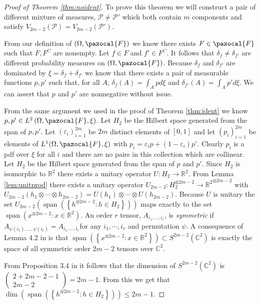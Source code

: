 \documentclass{article} %
\def\rn{\mathbb{R}}
\def\cn{\mathbb{C}}
\def\l{\left}
\def\r{\right}
\def\sF{\pazocal{F}}
\def\sP{\mathscr{P}}
\def\span{\operatorname{span}}
\theoremstyle{definition}
\begin{document}
\begin{proof}[Proof of Theorem \ref{thm:noident}]
To prove this theorem we will construct a pair of different mixture of measures, $\sP \neq \sP'$ which both contain $m$ components and satisfy $V_{2m-2}\left( \sP \right) = V_{2m-2}\left( \sP' \right)$.

From our definition of $\left( \Omega, \sF \right)$ we know there exists $F\in \sF$ such that $F, F^C$ are nonempty. Let $f\in F$ and $f' \in F^C$. It follows that $\delta_{f} \neq \delta_{f'}$ are different probability measures on $\left( \Omega, \sF \right)$. Because $\delta_{f}$ and $\delta_{f'}$ are dominated by $\xi = \delta_{f} + \delta_{f'}$ we know that there exists a pair of measurable functions $p, p'$ such that, for all $A$, $\delta_{f}\left( A \right) = \int_A p d\xi$ and $\delta_{f'}\left( A \right) = \int_{A} p'd\xi$. We can assert that $p$ and $p'$ are nonnegative without issue.

 From the same argument we used in the proof of Theorem \ref{thm:ident} we know $p,p' \in L^2\left( \Omega, \sF, \xi \right)$. Let $H_2$ be the Hilbert space generated from the span of $p,p'$. Let $(\varepsilon_i)_{i=1}^{2m}$ be $2m$ distinct elements of $\left[ 0,1 \right]$ and let $\left( p_i \right)_{i=1}^{2m}$ be elements of $L^1(\Omega, \sF, \xi)$ with $p_i = \varepsilon_i p + \left( 1-\varepsilon_i \right)p'$. Clearly $p_i$ is a pdf over $\xi$ for all $i$ and there are no pairs in this collection which are collinear. Let $H_2$ be the Hilbert space generated from the span of $p$ and $p'$. Since $H_2$ is isomorphic to $\rn^2$ there exists a unitary operator $U:H_2 \to \rn^2$. From Lemma \ref{lem:unitprod} there exists a unitary operator $U_{2m-2}:H_2^{\otimes 2m-2} \to {\rn^2}^{\otimes 2m-2}$ with $U_{2m-2}\left( h_1 \otimes\cdots \otimes h_{2m-2} \right) = U(h_1) \otimes \cdots \otimes U(h_{2m-2})$. Because $U$ is unitary the set $U_{2m-2}\left( \span\left( \left\{ h^{\otimes 2m-2}: h \in H_2 \right\} \right) \right)$ maps exactly to the set $\span\left( x^{\otimes 2m-2}:x \in \rn^2 \right)$.  An order $r$ tensor, $A_{i_1,\ldots,i_r}$, is {\it symmetric} if $A_{\psi\left( i_1 \right),\ldots,\psi\left( i_r \right)} = A_{i_1,\ldots,i_r}$for any $i_1,\cdots, i_r$ and permutation $\psi$. A consequence of Lemma 4.2 in \cite{symtensorrank} is that $\span\left( \l\{x^{\otimes 2m-2}:x \in \rn^2\r\} \right)\subset S^{2m-2}(\cn^2)$ is exactly the space of all symmetric order $2m-2$ tensors over $\cn^2$.

 From Proposition 3.4 in \cite{symtensorrank} it follows that the dimension of $S^{ 2m-2 }\left( \cn^2 \right)$ is $\left( \begin{array}{c} 2+ 2m-2-1 \\ 2m-2 \end{array} \right) = 2m-1$. From this we get that $\dim\left( \span\left( \left\{ h^{\otimes 2m-2}: h \in H_2 \right\} \right)\right)\le2m-1$.


\end{proof}
\end{document}
